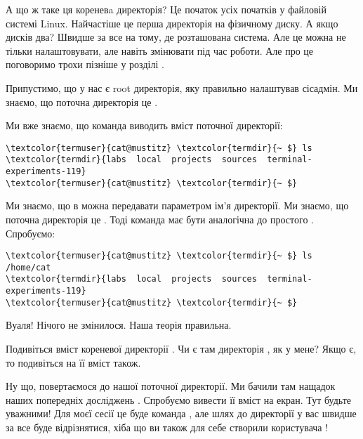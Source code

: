 А що ж таке ця кореневa директорія?
Це початок усіх початків у файловій системі Linux.
Найчастіше це перша директорія на фізичному диску.
А якщо дисків два?
Швидше за все на тому, де розташована система.
Але це можна не тільки налаштовувати, але навіть змінювати під час роботи.
Але про це поговоримо трохи пізніше у розділі .

Припустимо, що у нас є root директорія, яку правильно налаштував сісадмін.
Ми знаємо, що поточна директорія це .

Ми вже знаємо, що команда  виводить вміст поточної директорії:
\begin{Verbatim}[fontsize=\footnotesize,commandchars=\\\{\},xleftmargin=\parindent]
\textcolor{termuser}{cat@mustitz} \textcolor{termdir}{~ $} ls
\textcolor{termdir}{labs  local  projects  sources  terminal-experiments-119}
\textcolor{termuser}{cat@mustitz} \textcolor{termdir}{~ $}
\end{Verbatim}

Ми знаємо, що в  можна передавати параметром ім'я директорії.
Ми знаємо, що поточна директорія це .
Тоді команда  має бути аналогічна до простого .
Спробуємо:

\begin{Verbatim}[fontsize=\footnotesize,commandchars=\\\{\},xleftmargin=\parindent]
\textcolor{termuser}{cat@mustitz} \textcolor{termdir}{~ $} ls /home/cat
\textcolor{termdir}{labs  local  projects  sources  terminal-experiments-119}
\textcolor{termuser}{cat@mustitz} \textcolor{termdir}{~ $}
\end{Verbatim}

Вуаля! Нічого не змінилося. Наша теорія правильна.

\begin{exercise}
Подивіться вміст кореневої директорії \file{/}.
Чи є там директорія , як у мене?
Якщо є, то подивіться на її вміст також.
\end{exercise}

Ну що, повертаємося до нашої поточної директорії.
Ми бачили там нащадок наших попередніх досліджень .
Спробуємо вивести її вміст на екран.
Тут будьте уважними!
Для моєї сесії це буде команда ,
але шлях до директорії у вас швидше за все буде відрізнятися,
хіба що ви також для себе створили користувача !

